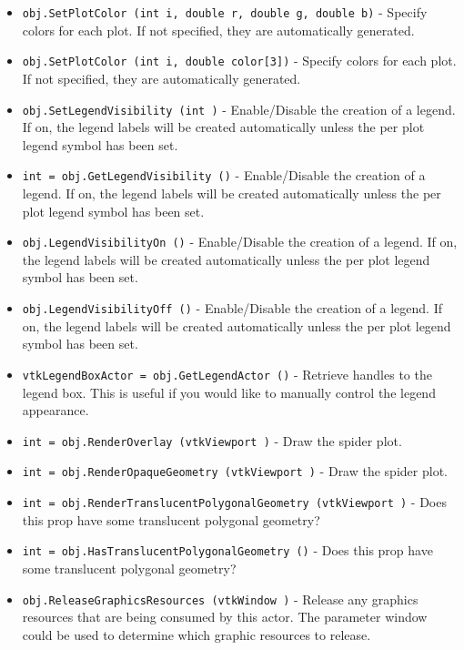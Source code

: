 \begin{itemize}
\item  \verb|obj.SetPlotColor (int i, double r, double g, double b)| -  Specify colors for each plot. If not specified, they are automatically generated.

\item  \verb|obj.SetPlotColor (int i, double color[3])| -  Specify colors for each plot. If not specified, they are automatically generated.

\item  \verb|obj.SetLegendVisibility (int )| -  Enable/Disable the creation of a legend. If on, the legend labels will
 be created automatically unless the per plot legend symbol has been
 set.

\item  \verb|int = obj.GetLegendVisibility ()| -  Enable/Disable the creation of a legend. If on, the legend labels will
 be created automatically unless the per plot legend symbol has been
 set.

\item  \verb|obj.LegendVisibilityOn ()| -  Enable/Disable the creation of a legend. If on, the legend labels will
 be created automatically unless the per plot legend symbol has been
 set.

\item  \verb|obj.LegendVisibilityOff ()| -  Enable/Disable the creation of a legend. If on, the legend labels will
 be created automatically unless the per plot legend symbol has been
 set.

\item  \verb|vtkLegendBoxActor = obj.GetLegendActor ()| -  Retrieve handles to the legend box. This is useful if you would like 
 to manually control the legend appearance.

\item  \verb|int = obj.RenderOverlay (vtkViewport )| -  Draw the spider plot.

\item  \verb|int = obj.RenderOpaqueGeometry (vtkViewport )| -  Draw the spider plot.

\item  \verb|int = obj.RenderTranslucentPolygonalGeometry (vtkViewport )| -  Does this prop have some translucent polygonal geometry?

\item  \verb|int = obj.HasTranslucentPolygonalGeometry ()| -  Does this prop have some translucent polygonal geometry?

\item  \verb|obj.ReleaseGraphicsResources (vtkWindow )| -  Release any graphics resources that are being consumed by this actor.
 The parameter window could be used to determine which graphic
 resources to release.

\end{itemize}
